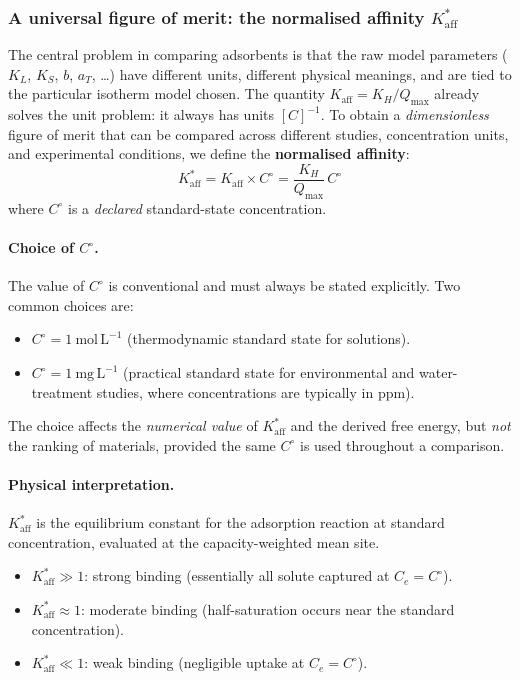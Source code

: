 	\subsubsection{A universal figure of merit: the normalised affinity
		$K_{\mathrm{aff}}^{\ast}$}

	The central problem in comparing adsorbents is that the raw
	model parameters ($K_L$, $K_S$, $b$, $a_T$, \ldots) have
	different units, different physical meanings, and are tied to the
	particular isotherm model chosen.
	The quantity $K_{\mathrm{aff}} = K_H / Q_{\max}$ already solves the
	unit problem: it always has units $[C]^{-1}$.
	To obtain a \emph{dimensionless} figure of merit that can be
	compared across different studies, concentration units, and
	experimental conditions, we define the \textbf{normalised affinity}:
	\begin{equation}
		\boxed{
			K_{\mathrm{aff}}^{\ast}
			= K_{\mathrm{aff}} \times C^\circ
			= \frac{K_H}{Q_{\max}}\, C^\circ
		}
		\label{eq:Kaff_star}
	\end{equation}
	where $C^\circ$ is a \emph{declared} standard-state concentration.

	\paragraph{Choice of $C^\circ$.}
	The value of $C^\circ$ is conventional and must always be stated
	explicitly.  Two common choices are:
	\begin{itemize}
		\item $C^\circ = 1~\mathrm{mol\,L^{-1}}$
		(thermodynamic standard state for solutions).
		\item $C^\circ = 1~\mathrm{mg\,L^{-1}}$ (practical standard
		state for environmental and water-treatment studies, where
		concentrations are typically in ppm).
	\end{itemize}
	The choice affects the \emph{numerical value} of
	$K_{\mathrm{aff}}^{\ast}$ and the derived free energy, but
	\emph{not} the ranking of materials, provided the same $C^\circ$
	is used throughout a comparison.

	\paragraph{Physical interpretation.}
	$K_{\mathrm{aff}}^{\ast}$ is the equilibrium constant for the
	adsorption reaction at standard concentration, evaluated at the
	capacity-weighted mean site.
	\begin{itemize}
		\item $K_{\mathrm{aff}}^{\ast} \gg 1$: strong binding
		(essentially all solute captured at $C_e = C^\circ$).
		\item $K_{\mathrm{aff}}^{\ast} \approx 1$: moderate binding
		(half-saturation occurs near the standard concentration).
		\item $K_{\mathrm{aff}}^{\ast} \ll 1$: weak binding
		(negligible uptake at $C_e = C^\circ$).
	\end{itemize}

